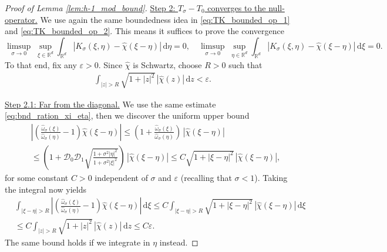 \documentclass[reqno, 11pt]{amsart}
\numberwithin{equation}{section}
\theoremstyle{definition}
\begin{document}
\begin{proof}[Proof of Lemma \ref{lem:h-1_mod_bound}]
    \underline{Step 2: $T_\sigma-T_0$ converges to the null-operator.} We use again the same boundedness idea in \eqref{eq:TK_bounded_op_1} and \eqref{eq:TK_bounded_op_2}. This means it suffices to prove the convergence
    \begin{equation}\label{eq:target_operators_norm_convergence_a_la_Schur_test}
        \limsup_{\sigma\rightarrow 0} \;\sup_{\xi\in\mathbb{R}^{d}} \int_{\mathbb{R}^{d}}|K_\sigma(\xi,\eta)-\hat{\chi}(\xi-\eta)|\,\mathrm{d} \eta
        =0,\quad
        \limsup_{\sigma\rightarrow 0} \;\sup_{\eta\in\mathbb{R}^{d}} \int_{\mathbb{R}^{d}}|K_\sigma(\xi,\eta)-\hat{\chi}(\xi-\eta)|\,\mathrm{d} \xi
        =0.
    \end{equation}
    To that end, fix any $\varepsilon>0$. Since $\hat{\chi}$ is Schwartz, choose $R>0$ such that
    \begin{align*}
        \int_{|z|>R}\sqrt{1+|z|^2}\,|\hat{\chi}(z)|\,\mathrm{d} z<\varepsilon.
    \end{align*}
    
    \underline{Step 2.1: Far from the diagonal.} We use the same estimate \eqref{eq:bnd_ration_xi_eta}, then we discover the uniform upper bound
    \begin{align*}
        &\left|\left(\frac{\hat{\omega}_\sigma(\xi)}{\hat{\omega}_\sigma(\eta)}-1\right)\hat{\chi}(\xi-\eta)\right|
        \leq \left(1+\frac{\hat{\omega}_\sigma(\xi)}{\hat{\omega}_\sigma(\eta)}\right)\,|\hat{\chi}(\xi-\eta)|\\
        &\leq \left(1+\mathcal{D}_0\mathcal{D}_1\sqrt{\frac{1+\sigma^2|\eta|^2}{1+\sigma^2|\xi|^2}}\right)\,|\hat{\chi}(\xi-\eta)|
        \leq C\sqrt{1+|\xi-\eta|^2}\,|\hat{\chi}(\xi-\eta)|,
    \end{align*}
    for some constant $C>0$ independent of $\sigma$ and $\varepsilon$ (recalling that $\sigma<1$). Taking the integral now yields
    \begin{align*}
        &\int_{|\xi-\eta|>R} \left|\left(\frac{\hat{\omega}_\sigma(\xi)}{\hat{\omega}_\sigma(\eta)}-1\right)\hat{\chi}(\xi-\eta)\right|\,\mathrm{d} \xi
        \leq C\int_{|\xi-\eta|>R}\sqrt{1+|\xi-\eta|^2}\,|\hat{\chi}(\xi-\eta)|\,\mathrm{d}\xi\\
        &\leq C\int_{|z|>R}\sqrt{1+|z|^2}\,|\hat{\chi}(z)|\,\mathrm{d} z
        \leq C\varepsilon.
    \end{align*}
    The same bound holds if we integrate in $\eta$ instead.
    

\end{proof}
\end{document}
